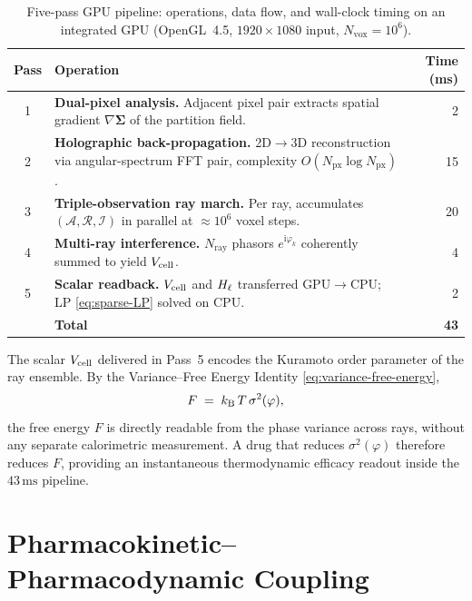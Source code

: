 \begin{table}[!htbp]
\centering
\caption{Five-pass GPU pipeline: operations, data flow, and wall-clock
timing on an integrated GPU (OpenGL~4.5, $1920\times1080$ input,
$N_{\mathrm{vox}} = 10^6$).}
\label{tab:ch09-gpu-5pass}
\begin{tabular}{@{}clr@{}}
\toprule
Pass & Operation & Time (ms) \\
\midrule
1 & \textbf{Dual-pixel analysis.}  Adjacent pixel pair extracts spatial
    gradient $\nabla\boldsymbol{\Sigma}$ of the partition field. & 2 \\
2 & \textbf{Holographic back-propagation.}  2D$\to$3D reconstruction via
    angular-spectrum FFT pair, complexity
    $O(N_{\mathrm{px}}\log N_{\mathrm{px}})$. & 15 \\
3 & \textbf{Triple-observation ray march.}  Per ray, accumulates
    $(\mathcal{A}, \mathcal{R}, \mathcal{I})$ in parallel at
    $\approx 10^6$ voxel steps. & 20 \\
4 & \textbf{Multi-ray interference.}  $N_{\mathrm{ray}}$ phasors
    $e^{\mathrm{i}\varphi_k}$ coherently summed to yield $V_{\mathrm{cell}}$. & 4 \\
5 & \textbf{Scalar readback.}  $V_{\mathrm{cell}}$ and $H_\ell$ transferred GPU$\to$CPU;
    LP \eqref{eq:sparse-LP} solved on CPU. & 2 \\
\midrule
  & \textbf{Total} & \textbf{43} \\
\bottomrule
\end{tabular}
\end{table}

\begin{remark}
The scalar $V_{\mathrm{cell}}$ delivered in Pass~5 encodes the Kuramoto order parameter
of the ray ensemble.  By the Variance--Free Energy Identity
\eqref{eq:variance-free-energy},
\begin{equation}
  F \;=\; k_{\mathrm{B}}\,T\,\sigma^2(\varphi),
  \label{eq:ch09-VFE-reprise}
\end{equation}
the free energy $F$ is directly readable from the phase variance across rays,
without any separate calorimetric measurement.  A drug that reduces
$\sigma^2(\varphi)$ therefore reduces $F$, providing an instantaneous
thermodynamic efficacy readout inside the $43\,\mathrm{ms}$ pipeline.
\end{remark}

\section{Pharmacokinetic--Pharmacodynamic Coupling}
\label{sec:ch09-pkpd}

